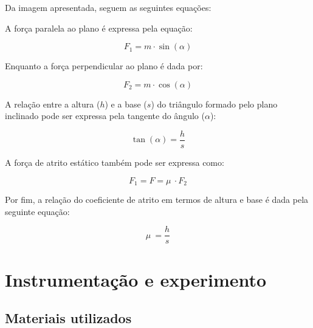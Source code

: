 \documentclass[aps,twocolumn,secnumarabic,balancelastpage,amsmath,amssymb,nofootinbib,floatfix]{revtex4-1}
\begin{document}
        \par Da imagem apresentada, seguem as seguintes equações:

        \par A força paralela ao plano é expressa pela equação:

        \begin{equation}
             F_1 = m \cdot \sin (\alpha)
            \label{eq:Força paralela ao plano}
        \end{equation}

        \par Enquanto a força perpendicular ao plano é dada por:
        
        \begin{equation}
             F_2 = m \cdot \cos (\alpha)
            \label{eq:Força perpendicular ao plano}
        \end{equation}

        \par A relação entre a altura (\(h\)) e a base (\(s\)) do triângulo formado pelo plano inclinado pode ser expressa pela tangente do ângulo (\(\alpha\)):
        
        \begin{equation}
             \tan(\alpha) =  \frac{h}{s}
            \label{eq:Relação tangente}
        \end{equation}

        \par A força de atrito estático também pode ser expressa como:
        
        \begin{equation}
            F_1 = F = \mu\ \cdot F_2 
            \label{eq:Força estática}
        \end{equation}

        \par Por fim, a relação do coeficiente de atrito em termos de altura e base é dada pela seguinte equação:
        
        \begin{equation}
            \mu\ = \frac{h}{s} 
            \label{eq:Relação do coeficiente de atrito}
        \end{equation}
           
    \section{Instrumentação e experimento}
        \subsection{Materiais utilizados}
\end{document}
